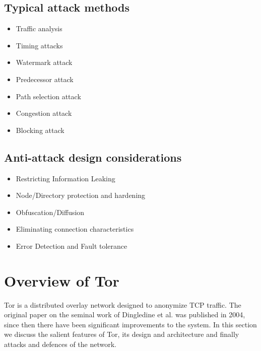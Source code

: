 \documentclass{llncs}
\begin{document}
\subsection{Typical attack methods}
\begin{itemize}
	\item{Traffic analysis}
	\item{Timing attacks}
	\item{Watermark attack}
	\item{Predecessor attack}
	\item{Path selection attack}
	\item{Congestion attack}
	\item{Blocking attack}
\end{itemize}
\subsection{Anti-attack design considerations}
\begin{itemize}
	\item{Restricting Information Leaking}
	\item{Node/Directory protection and hardening}
	\item{Obfuscation/Diffusion}
	\item{Eliminating connection characteristics}
	\item{Error Detection and Fault tolerance}
\end{itemize}

\section{Overview of Tor} \label{tor}
Tor is a distributed overlay network designed to anonymize TCP traffic. The original paper on the seminal work of Dingledine et al. \cite{tor-design} was published in 2004, since then there have been significant improvements to the system. In this section we discuss the salient features of Tor, its design and architecture and finally attacks and defences of the network. 
\end{document}
